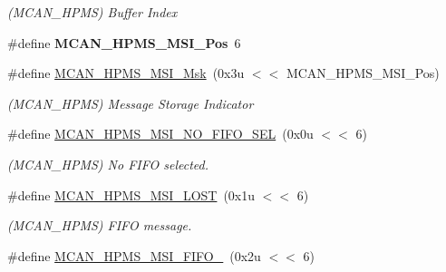 \begin{DoxyCompactItemize}
\begin{DoxyCompactList}\small\item\em (M\+C\+A\+N\+\_\+\+H\+P\+MS) Buffer Index \end{DoxyCompactList}\item 
\mbox{\label{group__SAME70__MCAN_ga51c55f8df47e99582c7e9ba4b8411e77}} 
\#define {\bfseries M\+C\+A\+N\+\_\+\+H\+P\+M\+S\+\_\+\+M\+S\+I\+\_\+\+Pos}~6
\item 
\mbox{\label{group__SAME70__MCAN_ga21ba73996601119744de6b8be7f349c0}} 
\#define \mbox{\hyperlink{group__SAME70__MCAN_ga21ba73996601119744de6b8be7f349c0}{M\+C\+A\+N\+\_\+\+H\+P\+M\+S\+\_\+\+M\+S\+I\+\_\+\+Msk}}~(0x3u $<$$<$ M\+C\+A\+N\+\_\+\+H\+P\+M\+S\+\_\+\+M\+S\+I\+\_\+\+Pos)
\begin{DoxyCompactList}\small\item\em (M\+C\+A\+N\+\_\+\+H\+P\+MS) Message Storage Indicator \end{DoxyCompactList}\item 
\mbox{\label{group__SAME70__MCAN_ga1417d340916704086d1692f4f774aa64}} 
\#define \mbox{\hyperlink{group__SAME70__MCAN_ga1417d340916704086d1692f4f774aa64}{M\+C\+A\+N\+\_\+\+H\+P\+M\+S\+\_\+\+M\+S\+I\+\_\+\+N\+O\+\_\+\+F\+I\+F\+O\+\_\+\+S\+EL}}~(0x0u $<$$<$ 6)
\begin{DoxyCompactList}\small\item\em (M\+C\+A\+N\+\_\+\+H\+P\+MS) No F\+I\+FO selected. \end{DoxyCompactList}\item 
\mbox{\label{group__SAME70__MCAN_ga5d4ad2d92dc983956caff684d6b8c785}} 
\#define \mbox{\hyperlink{group__SAME70__MCAN_ga5d4ad2d92dc983956caff684d6b8c785}{M\+C\+A\+N\+\_\+\+H\+P\+M\+S\+\_\+\+M\+S\+I\+\_\+\+L\+O\+ST}}~(0x1u $<$$<$ 6)
\begin{DoxyCompactList}\small\item\em (M\+C\+A\+N\+\_\+\+H\+P\+MS) F\+I\+FO message. \end{DoxyCompactList}\item 
\mbox{\label{group__SAME70__MCAN_gabd49338c1a366c1e6387e37d942dd817}} 
\#define \mbox{\hyperlink{group__SAME70__MCAN_gabd49338c1a366c1e6387e37d942dd817}{M\+C\+A\+N\+\_\+\+H\+P\+M\+S\+\_\+\+M\+S\+I\+\_\+\+F\+I\+F\+O\+\_}}~(0x2u $<$$<$ 6)

\end{DoxyCompactItemize}

